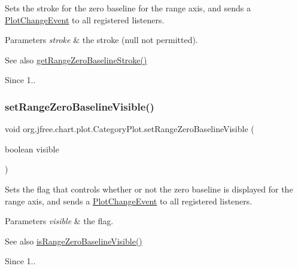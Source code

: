 Sets the stroke for the zero baseline for the range axis, and sends a \mbox{\hyperlink{}{Plot\+Change\+Event}} to all registered listeners.


\begin{DoxyParams}{Parameters}
{\em stroke} & the stroke ({\ttfamily null} not permitted).\\
\hline
\end{DoxyParams}
\begin{DoxySeeAlso}{See also}
\mbox{\hyperlink{classorg_1_1jfree_1_1chart_1_1plot_1_1_category_plot_a6f347b53454425e0038114bff25b9ece}{get\+Range\+Zero\+Baseline\+Stroke()}}
\end{DoxySeeAlso}
\begin{DoxySince}{Since}
1.. 
\end{DoxySince}
\mbox{\label{classorg_1_1jfree_1_1chart_1_1plot_1_1_category_plot_a8c045c78c8456162ac2c58f4d2fe015d}} 
\subsubsection{\texorpdfstring{set\+Range\+Zero\+Baseline\+Visible()}{setRangeZeroBaselineVisible()}}
{\footnotesize\ttfamily void org.\+jfree.\+chart.\+plot.\+Category\+Plot.\+set\+Range\+Zero\+Baseline\+Visible (\begin{DoxyParamCaption}\item[{boolean}]{visible }\end{DoxyParamCaption})}

Sets the flag that controls whether or not the zero baseline is displayed for the range axis, and sends a \mbox{\hyperlink{}{Plot\+Change\+Event}} to all registered listeners.


\begin{DoxyParams}{Parameters}
{\em visible} & the flag.\\
\hline
\end{DoxyParams}
\begin{DoxySeeAlso}{See also}
\mbox{\hyperlink{classorg_1_1jfree_1_1chart_1_1plot_1_1_category_plot_a32cccbcca493597d95bf54338573cc0a}{is\+Range\+Zero\+Baseline\+Visible()}}
\end{DoxySeeAlso}
\begin{DoxySince}{Since}
1.. 
\end{DoxySince}
\mbox{\label{classorg_1_1jfree_1_1chart_1_1plot_1_1_category_plot_ac375aaa8e79ffb62fab2a94cdf5c2217}} 
